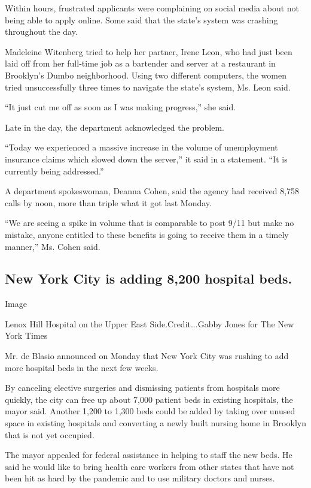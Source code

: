 Within hours, frustrated applicants were complaining on social media
about not being able to apply online. Some said that the state's system
was crashing throughout the day.

Madeleine Witenberg tried to help her partner, Irene Leon, who had just
been laid off from her full-time job as a bartender and server at a
restaurant in Brooklyn's Dumbo neighborhood. Using two different
computers, the women tried unsuccessfully three times to navigate the
state's system, Ms. Leon said.

``It just cut me off as soon as I was making progress,'' she said.

Late in the day, the department acknowledged the problem.

``Today we experienced a massive increase in the volume of unemployment
insurance claims which slowed down the server,'' it said in a statement.
``It is currently being addressed.''

A department spokeswoman, Deanna Cohen, said the agency had received
8,758 calls by noon, more than triple what it got last Monday.

``We are seeing a spike in volume that is comparable to post 9/11 but
make no mistake, anyone entitled to these benefits is going to receive
them in a timely manner,'' Ms. Cohen said.

\hypertarget{new-york-city-is-adding-8200-hospital-beds}{%
\subsection{New York City is adding 8,200 hospital
beds.}\label{new-york-city-is-adding-8200-hospital-beds}}

Image

Lenox Hill Hospital on the Upper East Side.Credit...Gabby Jones for The
New York Times

Mr. de Blasio announced on Monday that New York City was rushing to add
more hospital beds in the next few weeks.

By canceling elective surgeries and dismissing patients from hospitals
more quickly, the city can free up about 7,000 patient beds in existing
hospitals, the mayor said. Another 1,200 to 1,300 beds could be added by
taking over unused space in existing hospitals and converting a newly
built nursing home in Brooklyn that is not yet occupied.

The mayor appealed for federal assistance in helping to staff the new
beds. He said he would like to bring health care workers from other
states that have not been hit as hard by the pandemic and to use
military doctors and nurses.

